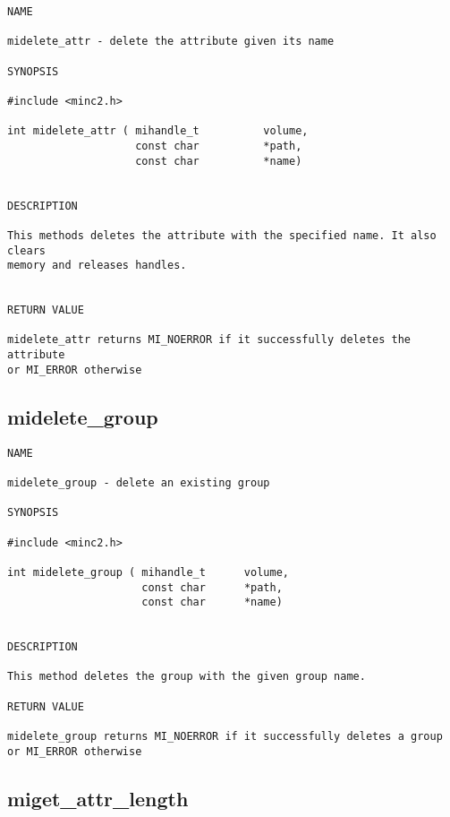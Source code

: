 \documentclass{article}
\begin{document}
\begin{verbatim}
NAME 

midelete_attr - delete the attribute given its name

SYNOPSIS

#include <minc2.h>

int midelete_attr ( mihandle_t          volume,
                    const char          *path,
                    const char          *name)
                       
                                
DESCRIPTION

This methods deletes the attribute with the specified name. It also clears 
memory and releases handles.


RETURN VALUE

midelete_attr returns MI_NOERROR if it successfully deletes the attribute
or MI_ERROR otherwise

\end{verbatim}

\subsection{midelete\_group}

\begin{verbatim}
NAME 

midelete_group - delete an existing group

SYNOPSIS

#include <minc2.h>

int midelete_group ( mihandle_t      volume,
                     const char      *path,
                     const char      *name)    
                       
                                
DESCRIPTION

This method deletes the group with the given group name.

RETURN VALUE

midelete_group returns MI_NOERROR if it successfully deletes a group 
or MI_ERROR otherwise

\end{verbatim}

\subsection{miget\_attr\_length}
\end{document}
